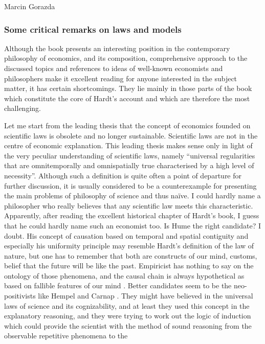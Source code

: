 \begin{recengenv}{Marcin Gorazda}
\subsubsection{Some critical remarks on laws and models}
Although the book presents an interesting position in the contemporary philosophy of economics, and its composition,
comprehensive approach to the discussed topics and references to ideas of well-known economists and philosophers make
it excellent reading for anyone interested in the subject matter, it has certain shortcomings. They lie mainly in those
parts of the book which constitute the core of Hardt’s account and which are therefore the most challenging.  

Let me start from the leading thesis that the concept of economics founded on scientific laws is obsolete and no longer
sustainable. Scientific laws are not in the centre of economic explanation. This leading thesis makes sense only in
light of the very peculiar understanding of scientific laws, namely ``universal regularities that are omnitemporally and
omnispatially true characterised by a high level of necessity''. Although such a definition is quite often a point of
departure for further discussion, it is usually considered to be a counterexample for presenting the main problems of
philosophy of science and thus naïve. I could hardly name a philosopher who really believes that any scientific law
meets this characteristic. Apparently, after reading the excellent historical chapter of Hardt’s book, I guess that he
could hardly name such an economist too. Is Hume the right candidate? I doubt. His concept of causation based on
temporal and spatial contiguity and especially his uniformity principle may resemble Hardt’s definition of the law of
nature, but one has to remember that both are constructs of our mind,  customs, belief that the future will be like the
past. Empiricist has nothing to say on the ontology of those phenomena, and the causal chain is always hypothetical as
based on fallible features of our mind
\parencite{hume_treatise_2000}.
Better candidates seem to be the
neo-positivists like Hempel
\parencite{hempel_studies_1948}
and Carnap
\parencite*{carnap_logical_1967}.
They might have believed in the universal laws of science and its cognizability, and
at least they used this concept in the explanatory reasoning, and they were trying to work out the logic of induction
which could provide the scientist with the method of sound reasoning from the observable repetitive phenomena to the

\end{recengenv}
